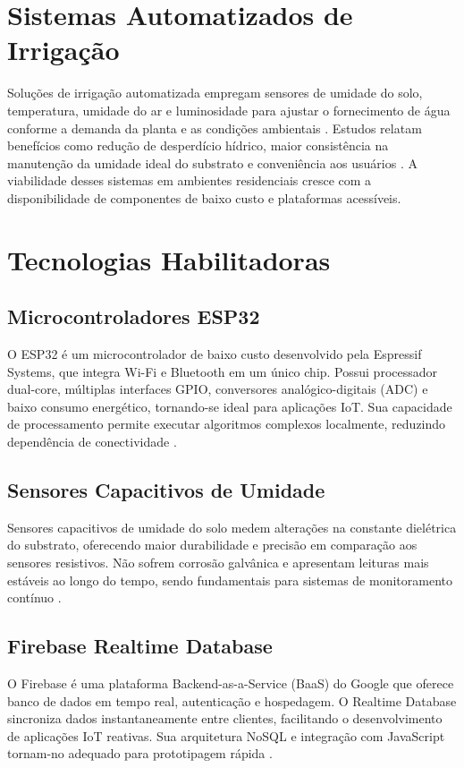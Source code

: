 \documentclass[twoside,english,brazilian]{UNISINOSmonografia}
\begin{document}
\section{Sistemas Automatizados de Irrigação}
Soluções de irrigação automatizada empregam sensores de umidade do solo, temperatura, umidade do ar e luminosidade para ajustar o fornecimento de água conforme a demanda da planta e as condições ambientais \cite{fernandes2021}. Estudos relatam benefícios como redução de desperdício hídrico, maior consistência na manutenção da umidade ideal do substrato e conveniência aos usuários \cite{pereira2021}. A viabilidade desses sistemas em ambientes residenciais cresce com a disponibilidade de componentes de baixo custo e plataformas acessíveis.

\section{Tecnologias Habilitadoras}

\subsection{Microcontroladores ESP32}
O ESP32 é um microcontrolador de baixo custo desenvolvido pela Espressif Systems, que integra Wi-Fi e Bluetooth em um único chip. Possui processador dual-core, múltiplas interfaces GPIO, conversores analógico-digitais (ADC) e baixo consumo energético, tornando-se ideal para aplicações IoT. Sua capacidade de processamento permite executar algoritmos complexos localmente, reduzindo dependência de conectividade \cite{santos2020}.

\subsection{Sensores Capacitivos de Umidade}
Sensores capacitivos de umidade do solo medem alterações na constante dielétrica do substrato, oferecendo maior durabilidade e precisão em comparação aos sensores resistivos. Não sofrem corrosão galvânica e apresentam leituras mais estáveis ao longo do tempo, sendo fundamentais para sistemas de monitoramento contínuo \cite{almeida2020}.

\subsection{Firebase Realtime Database}
O Firebase é uma plataforma Backend-as-a-Service (BaaS) do Google que oferece banco de dados em tempo real, autenticação e hospedagem. O Realtime Database sincroniza dados instantaneamente entre clientes, facilitando o desenvolvimento de aplicações IoT reativas. Sua arquitetura NoSQL e integração com JavaScript tornam-no adequado para prototipagem rápida \cite{firebase2023}.
\end{document}
